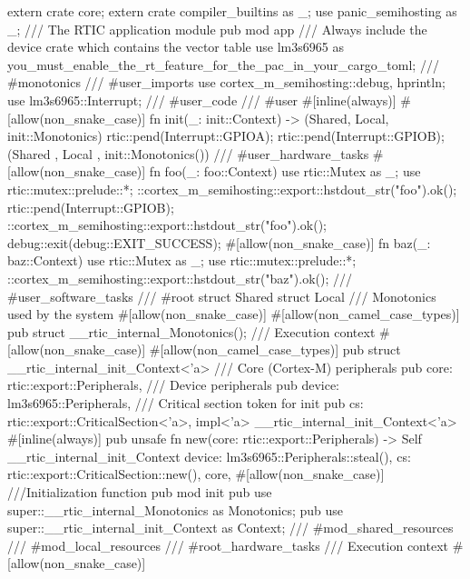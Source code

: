 extern crate core;
extern crate compiler_builtins as _;
use panic_semihosting as _;
/// The RTIC application module
pub mod app {
    /// Always include the device crate which contains the vector table
    use lm3s6965 as you_must_enable_the_rt_feature_for_the_pac_in_your_cargo_toml;
    /// #monotonics
    /// #user_imports
    use cortex_m_semihosting::{debug, hprintln};
    use lm3s6965::Interrupt;
    /// #user_code
    /// #user
    #[inline(always)]
    #[allow(non_snake_case)]
    fn init(_: init::Context) -> (Shared, Local, init::Monotonics) {
        rtic::pend(Interrupt::GPIOA);
        rtic::pend(Interrupt::GPIOB);
        (Shared {}, Local {}, init::Monotonics())
    }
    /// #user_hardware_tasks
    #[allow(non_snake_case)]
    fn foo(_: foo::Context) {
        use rtic::Mutex as _;
        use rtic::mutex::prelude::*;
        ::cortex_m_semihosting::export::hstdout_str("foo\n").ok();
        rtic::pend(Interrupt::GPIOB);
        ::cortex_m_semihosting::export::hstdout_str("foo\n").ok();
        debug::exit(debug::EXIT_SUCCESS);
    }
    #[allow(non_snake_case)]
    fn baz(_: baz::Context) {
        use rtic::Mutex as _;
        use rtic::mutex::prelude::*;
        ::cortex_m_semihosting::export::hstdout_str("baz\n").ok();
    }
    /// #user_software_tasks
    /// #root
    struct Shared {}
    struct Local {}
    /// Monotonics used by the system
    #[allow(non_snake_case)]
    #[allow(non_camel_case_types)]
    pub struct __rtic_internal_Monotonics();
    /// Execution context
    #[allow(non_snake_case)]
    #[allow(non_camel_case_types)]
    pub struct __rtic_internal_init_Context<'a> {
        /// Core (Cortex-M) peripherals
        pub core: rtic::export::Peripherals,
        /// Device peripherals
        pub device: lm3s6965::Peripherals,
        /// Critical section token for init
        pub cs: rtic::export::CriticalSection<'a>,
    }
    impl<'a> __rtic_internal_init_Context<'a> {
        #[inline(always)]
        pub unsafe fn new(core: rtic::export::Peripherals) -> Self {
            __rtic_internal_init_Context {
                device: lm3s6965::Peripherals::steal(),
                cs: rtic::export::CriticalSection::new(),
                core,
            }
        }
    }
    #[allow(non_snake_case)]
    ///Initialization function
    pub mod init {
        pub use super::__rtic_internal_Monotonics as Monotonics;
        pub use super::__rtic_internal_init_Context as Context;
    }
    /// #mod_shared_resources
    /// #mod_local_resources
    /// #root_hardware_tasks
    /// Execution context
    #[allow(non_snake_case)]
}
